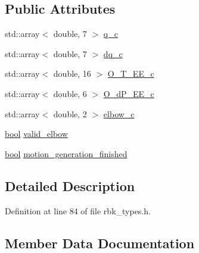 \subsection*{Public Attributes}
\begin{DoxyCompactItemize}
\item 
std\+::array$<$ double, 7 $>$ \hyperlink{structresearch__interface_1_1robot_1_1MotionGeneratorCommand_aae29370603fa15690aeab4961aec0f36}{q\+\_\+c}
\item 
std\+::array$<$ double, 7 $>$ \hyperlink{structresearch__interface_1_1robot_1_1MotionGeneratorCommand_ab8de7c1bdd902fbf88b2d3637a958a54}{dq\+\_\+c}
\item 
std\+::array$<$ double, 16 $>$ \hyperlink{structresearch__interface_1_1robot_1_1MotionGeneratorCommand_a7291f9f7ad3b2cce841f4c0f2a976acb}{O\+\_\+\+T\+\_\+\+E\+E\+\_\+c}
\item 
std\+::array$<$ double, 6 $>$ \hyperlink{structresearch__interface_1_1robot_1_1MotionGeneratorCommand_ab7e7e2e76ab64b86802b95a20780412f}{O\+\_\+d\+P\+\_\+\+E\+E\+\_\+c}
\item 
std\+::array$<$ double, 2 $>$ \hyperlink{structresearch__interface_1_1robot_1_1MotionGeneratorCommand_a04b8ac36d04098c1f7b2935bb954af95}{elbow\+\_\+c}
\item 
\hyperlink{classbool}{bool} \hyperlink{structresearch__interface_1_1robot_1_1MotionGeneratorCommand_a1ad30cc0b7210a2d93914e3f98c0ef22}{valid\+\_\+elbow}
\item 
\hyperlink{classbool}{bool} \hyperlink{structresearch__interface_1_1robot_1_1MotionGeneratorCommand_af42f06a136505ab2d62ecd70e4cc0db7}{motion\+\_\+generation\+\_\+finished}
\end{DoxyCompactItemize}


\subsection{Detailed Description}


Definition at line 84 of file rbk\+\_\+types.\+h.



\subsection{Member Data Documentation}
\mbox{\label{structresearch__interface_1_1robot_1_1MotionGeneratorCommand_ab8de7c1bdd902fbf88b2d3637a958a54}} 
